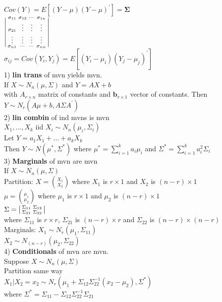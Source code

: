 \documentclass[10pt,landscape]{article}
\newenvironment{lmat}
{\left|\begin{smallmatrix}}
	{\end{smallmatrix}\right|}
\newcommand{\sg}{\sigma}
\begin{document}
\begin{multicols*}{4}
$Cov(Y)=E[(Y-\mu)(Y-\mu)^{'}]=\bm{\Sigma}$\\
$\begin{lmat}
\sigma_{11}&\sigma_{12}&\cdots& \sg_{1n}\\
\sg_{21}& \vdots & \vdots & \vdots\\
\vdots & \vdots & \vdots & \vdots\\
\sg_{n1} &\cdots & \cdots& \sg_{nn} 
\end{lmat}$\\
$\sg_{ij}=Cov(Y_i,Y_j)=E[(Y_i-\mu_i)(Y_j-\mu_j)^{'}]$\\
1) \textbf{lin trans} of mvn yields  mvn.\\
If $X\sim N_n(\mu,\Sigma)$ and $Y=AX+b$\\
with $A_{r\times n}$  matrix of constants and $\bm{b}_{r \times 1}$ vector of constants. Then $Y\sim N_r(A\mu+b,A\Sigma A^{'})$\\
2) \textbf{lin combin} of ind mvns is mvn\\
$X_1,\dots,X_k$ iid $X_i\sim N_n(\mu_i,\Sigma_i)$\\
Let $Y=a_1X_1+\dots+a_kX_k$\\
Then $Y\sim N(\mu^*,\Sigma^*)$ where $\mu^{*}=\sum_{i=1}^{k}a_i\mu_i$ and $\Sigma^*=\sum_{i=1}^{k}a_i^2\Sigma_i$\\
3) \textbf{Marginals} of mvn are mvn\\
If $X\sim N_n(\mu,\Sigma)$\\
Partition:
$X={X_1 \choose X_2}$ where $X_1$ is $r\times 1$ and $X_2$ is $(n-r)\times 1$\\
$\mu={\mu_1\choose \mu_2}$ where $\mu_1$ is $r\times 1$ and $\mu_2$ is $(n-r)\times 1$\\
$\Sigma=
\begin{lmat}
\Sigma_{11}&\Sigma_{12}\\
\Sigma_{21}&\Sigma_{22}
\end{lmat}$\\
where $\Sigma_{11}$ is $r\times r$, $\Sigma_{21}$ is $(n-r)\times r$ and $\Sigma_{22}$ is $(n-r)\times (n-r)$\\
Marginals:
$X_1\sim N_r(\mu_1,\Sigma_{11})$\\ 
$X_2\sim N_{(n-r)}(\mu_2,\Sigma_{22})$\\
4) \textbf{Conditionals} of mvn are mvn.\\
Suppose $X\sim N_n(\mu,\Sigma)$\\
Partition same way\\
$X_1|X_2=x_2\sim N_r(\mu_1+\Sigma_{12}\Sigma_{22}^{-1}(x_2-\mu_2),\Sigma^*)$\\
where $\Sigma^*=\Sigma_{11}-\Sigma_{12}\Sigma_{22}^{-1}\Sigma_{21}$\\



\end{multicols*}
\end{document}
